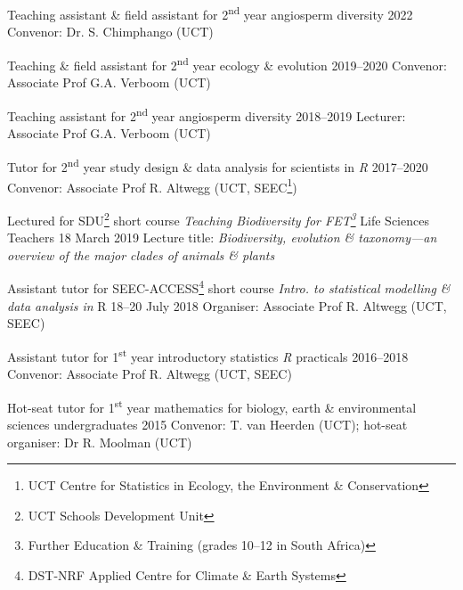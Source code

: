 \documentclass[10pt]{article}
\begin{document}
\begin{hangparas}{2em}{1}

Teaching assistant \& field assistant for 2\textsuperscript{nd} year angiosperm
diversity                                            \hfill {\small 2022} \break
Convenor: Dr. S. Chimphango (UCT)

Teaching \& field assistant for 2\textsuperscript{nd} year ecology \& evolution
                                               \hfill {\small 2019--2020} \break
Convenor: Associate Prof G.A. Verboom (UCT)

Teaching assistant for 2\textsuperscript{nd} year angiosperm diversity
                                               \hfill {\small 2018--2019} \break
Lecturer: Associate Prof G.A. Verboom (UCT)

Tutor for 2\textsuperscript{nd} year study design \& data analysis for 
scientists in \textit{R}                       \hfill {\small 2017--2020} \break
Convenor: Associate Prof R. Altwegg (UCT, SEEC\footnote{UCT Centre for 
Statistics in Ecology, the Environment \& Conservation})

Lectured for SDU\footnote{UCT Schools Development Unit} short course 
\textit{Teaching Biodiversity for FET\footnote{Further Education \& Training
(grades 10--12 in South Africa)}} Life Sciences Teachers
                                            \hfill {\small 18 March 2019} \break
Lecture title: \textit{Biodiversity, evolution \& taxonomy---an overview of the 
major clades of animals \& plants}

Assistant tutor for SEEC-ACCESS\footnote{DST-NRF Applied Centre for Climate \&
Earth Systems} short course \textit{Intro. to statistical modelling \& data 
analysis in} R                           \hfill {\small 18--20 July 2018} \break
Organiser: Associate Prof R. Altwegg (UCT, SEEC)

Assistant tutor for 1\textsuperscript{st} year introductory statistics
\textit{R} practicals                          \hfill {\small 2016--2018} \break
Convenor: Associate Prof R. Altwegg (UCT, SEEC)

Hot-seat tutor for 1\textsuperscript{st} year mathematics for biology, earth \& 
environmental sciences undergraduates                \hfill {\small 2015} \break
Convenor: T. van Heerden (UCT); hot-seat organiser: Dr R. Moolman (UCT)

\end{hangparas}

\clearpage
\end{document}
